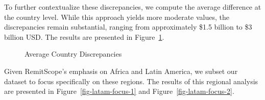 \documentclass[
  11pt,
]{article}
\begin{document}
To further contextualize these discrepancies, we compute the average
difference at the country level. While this approach yields more
moderate values, the discrepancies remain substantial, ranging from
approximately \$1.5 billion to \$3 billion USD. The results are
presented in Figure~\ref{fig-avg-country-discrepancies}.

\begin{figure}[H]


\caption{\label{fig-avg-country-discrepancies}Average Country
Discrepancies}

\end{figure}%

Given RemitScope's emphasis on Africa and Latin America, we subset our
dataset to focus specifically on these regions. The results of this
regional analysis are presented in Figure~\ref{fig-latam-focus-1} and
Figure~\ref{fig-latam-focus-2}.
\end{document}
